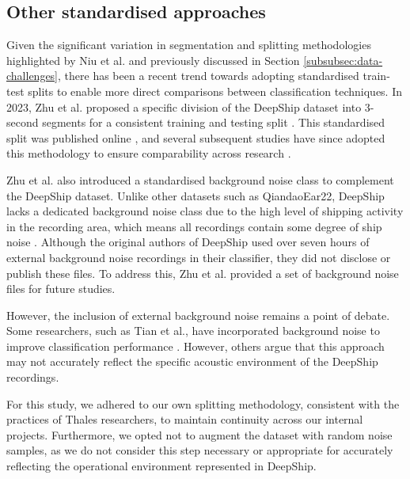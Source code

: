 \subsection{Other standardised approaches}

Given the significant variation in segmentation and splitting methodologies highlighted by Niu et al. \cite{niu_advances_2023} and previously discussed in Section \ref{subsubsec:data-challenges}, there has been a recent trend towards adopting standardised train-test splits to enable more direct comparisons between classification techniques. In 2023, Zhu et al. proposed a specific division of the DeepShip dataset into 3-second segments for a consistent training and testing split \cite{zhu_underwater_2023}. This standardised split was published online \cite{zhupengsen_zhupengsenmethod-for-splitting--deepship-dataset_2024}, and several subsequent studies have since adopted this methodology to ensure comparability across research \cite{xu_self-supervised_2023, xu_self-supervised_2024, zhu_sfc-sup_2023, lin_underwater_2024}.

Zhu et al. also introduced a standardised background noise class to complement the DeepShip dataset. Unlike other datasets such as QiandaoEar22, DeepShip lacks a dedicated background noise class due to the high level of shipping activity in the recording area, which means all recordings contain some degree of ship noise \cite{irfan_deepship_2021}. Although the original authors of DeepShip used over seven hours of external background noise recordings in their classifier, they did not disclose or publish these files. To address this, Zhu et al. provided a set of background noise files for future studies.

However, the inclusion of external background noise remains a point of debate. Some researchers, such as Tian et al., have incorporated background noise to improve classification performance \cite{tian_joint_2023}. However, others argue that this approach may not accurately reflect the specific acoustic environment of the DeepShip recordings.

For this study, we adhered to our own splitting methodology, consistent with the practices of Thales researchers, to maintain continuity across our internal projects. Furthermore, we opted not to augment the dataset with random noise samples, as we do not consider this step necessary or appropriate for accurately reflecting the operational environment represented in DeepShip.

